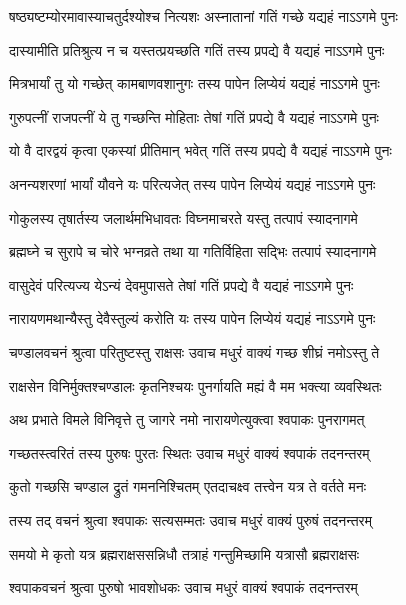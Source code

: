 \twolineshloka
{षष्ठ्यष्टम्योरमावास्याचतुर्दश्योश्च नित्यशः}
{अस्नातानां गतिं गच्छे यद्यहं नाऽऽगमे पुनः}%

\twolineshloka
{दास्यामीति प्रतिश्रुत्य न च यस्तत्प्रयच्छति}
{गतिं तस्य प्रपद्ये वै यद्यहं नाऽऽगमे पुनः}%

\twolineshloka
{मित्रभार्यां तु यो गच्छेत् कामबाणवशानुगः}
{तस्य पापेन लिप्येयं यद्यहं नाऽऽगमे पुनः}%

\twolineshloka
{गुरुपत्नीं राजपत्नीं ये तु गच्छन्ति मोहिताः}
{तेषां गतिं प्रपद्ये वै यद्यहं नाऽऽगमे पुनः}%

\twolineshloka
{यो वै दारद्वयं कृत्वा एकस्यां प्रीतिमान् भवेत्}
{गतिं तस्य प्रपद्ये वै यद्यहं नाऽऽगमे पुनः}%

\twolineshloka
{अनन्यशरणां भार्यां यौवने यः परित्यजेत्}
{तस्य पापेन लिप्येयं यद्यहं नाऽऽगमे पुनः}%

\twolineshloka
{गोकुलस्य तृषार्तस्य जलार्थमभिधावतः}
{विघ्नमाचरते यस्तु तत्पापं स्यादनागमे}%

\twolineshloka
{ब्रह्मघ्ने च सुरापे च चोरे भग्नव्रते तथा}
{या गतिर्विहिता सद्भिः तत्पापं स्यादनागमे}%

\twolineshloka
{वासुदेवं परित्यज्य येऽन्यं देवमुपासते}
{तेषां गतिं प्रपद्ये वै यद्यहं नाऽऽगमे पुनः}%

\twolineshloka
{नारायणमथान्यैस्तु देवैस्तुल्यं करोति यः}
{तस्य पापेन लिप्येयं यद्यहं नाऽऽगमे पुनः}%

\twolineshloka
{चण्डालवचनं श्रुत्वा परितुष्टस्तु राक्षसः}
{उवाच मधुरं वाक्यं गच्छ शीघ्रं नमोऽस्तु ते}%

\twolineshloka
{राक्षसेन विनिर्मुक्तश्चण्डालः कृतनिश्चयः}
{पुनर्गायति मह्यं वै मम भक्त्या व्यवस्थितः}%

\twolineshloka
{अथ प्रभाते विमले विनिवृत्ते तु जागरे}
{नमो नारायणेत्युक्त्वा श्वपाकः पुनरागमत्}%

\twolineshloka
{गच्छतस्त्वरितं तस्य पुरुषः पुरतः स्थितः}
{उवाच मधुरं वाक्यं श्वपाकं तदनन्तरम्}%

\twolineshloka
{कुतो गच्छसि चण्डाल द्रुतं गमननिश्चितम्}
{एतदाचक्ष्व तत्त्वेन यत्र ते वर्तते मनः}%

\twolineshloka
{तस्य तद् वचनं श्रुत्वा श्वपाकः सत्यसम्मतः}
{उवाच मधुरं वाक्यं पुरुषं तदनन्तरम्}%

\twolineshloka
{समयो मे कृतो यत्र ब्रह्मराक्षससन्निधौ}
{तत्राहं गन्तुमिच्छामि यत्रासौ ब्रह्मराक्षसः}%

\twolineshloka
{श्वपाकवचनं श्रुत्वा पुरुषो भावशोधकः}
{उवाच मधुरं वाक्यं श्वपाकं तदनन्तरम्}%

